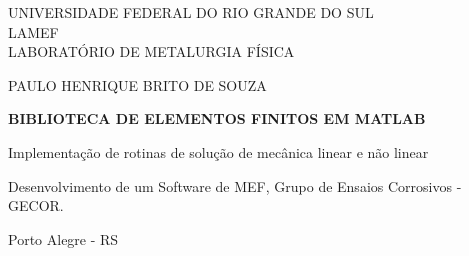 \pagestyle{empty} %

\begin{center}

\vspace*{2cm} 

{\MakeUppercase{
    UNIVERSIDADE FEDERAL DO RIO GRANDE DO SUL \\
    LAMEF\\
    LABORATÓRIO DE METALURGIA FÍSICA
    }}
\vspace{1cm}

{\MakeUppercase{paulo henrique brito de souza}}
\vspace{3cm}

{\bfseries\MakeUppercase{Biblioteca de elementos finitos em MATLAB}}
\vspace{0.5cm}

{Implementação de rotinas de solução de mecânica linear e não linear}
\vspace{3cm}

\begin{flushright}
            \parbox{0.5\linewidth}{
                \justifying
                \parindent=0pt
                Desenvolvimento de um Software de MEF, \linebreak
                Grupo de Ensaios Corrosivos - GECOR.}
        \end{flushright}

\vfill

{Porto Alegre - RS} %
\vspace{0.5cm}

{\the\year} %

\end{center}
\newpage